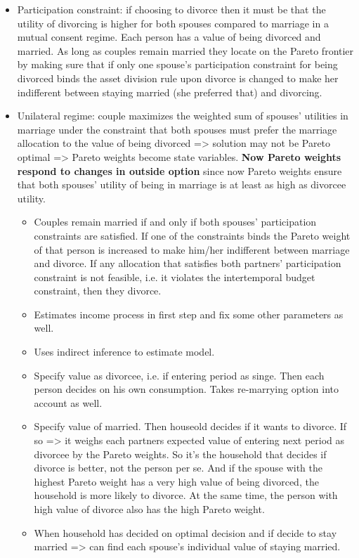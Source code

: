 \begin{itemize}
\begin{itemize}
\item Participation constraint: if choosing to divorce then it must be that the utility of divorcing is higher for both spouses compared to marriage in a mutual consent regime. Each person has a value of being divorced and married. As long as couples remain married they locate on the Pareto frontier by making sure that if only one spouse's participation constraint for being divorced binds the asset division rule upon divorce is changed to make her indifferent between staying married (she preferred that) and divorcing.
\item Unilateral regime: couple maximizes the weighted sum of spouses’ utilities in marriage under the constraint that both spouses must prefer the marriage allocation to the value of being divorced => solution may not be Pareto optimal => Pareto weights become state variables. \textbf{Now Pareto weights respond to changes in outside option} since now Pareto weights ensure that both spouses' utility of being in marriage is at least as high as divorcee utility.
\begin{itemize}
\item Couples remain married if and only if both spouses' participation constraints are satisfied. If one of the constraints binds the Pareto weight of that person is increased to make him/her indifferent between marriage and divorce. If any allocation that satisfies both partners' participation constraint is not feasible, i.e. it violates the intertemporal budget constraint, then they divorce.
\item Estimates income process in first step and fix some other parameters as well.
\item Uses indirect inference to estimate model.
\item Specify value as divorcee, i.e. if entering period as singe. Then each person decides on his own consumption. Takes re-marrying option into account as well.
\item Specify value of married. Then houseold decides if it wants to divorce. If so => it weighs each partners expected value of entering next period as divorcee by the Pareto weights. So it's the household that decides if divorce is better, not the person per se. And if the spouse with the highest Pareto weight has a very high value of being divorced, the household is more likely to divorce. At the same time, the person with high value of divorce also has the high Pareto weight.
\item When household has decided on optimal decision and if decide to stay married => can find each spouse's individual value of staying married.

\end{itemize}
\end{itemize}
\end{itemize}
